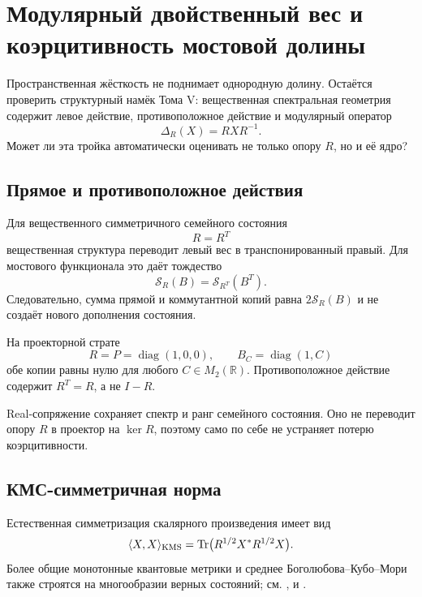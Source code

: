\chapter{Модулярный двойственный вес и коэрцитивность мостовой долины}

Пространственная жёсткость не поднимает однородную долину. Остаётся
проверить структурный намёк Тома V: вещественная спектральная геометрия
содержит левое действие, противоположное действие и модулярный оператор
\begin{equation}
 \Delta_R(X)=RXR^{-1}.
\end{equation}
Может ли эта тройка автоматически оценивать не только опору $R$, но и её
ядро?

\section{Прямое и противоположное действия}

Для вещественного симметричного семейного состояния
\begin{equation}
 R=R^T
\end{equation}
вещественная структура переводит левый вес в транспонированный правый.
Для мостового функционала это даёт тождество
\begin{equation}
 \mathcal S_R(B)=\mathcal S_{R^T}(B^T).
 \label{eq:v6-modular-dual-transpose-identity}
\end{equation}
Следовательно, сумма прямой и коммутантной копий равна
$2\mathcal S_R(B)$ и не создаёт нового дополнения состояния.

На проекторной страте
\begin{equation}
 R=P=\operatorname{diag}(1,0,0),
 \qquad B_C=\operatorname{diag}(1,C)
\end{equation}
обе копии равны нулю для любого $C\in M_2(\mathbb R)$. Противоположное
действие содержит $R^T=R$, а не $I-R$.

\begin{proposition}
Real-сопряжение сохраняет спектр и ранг семейного состояния. Оно не
переводит опору $R$ в проектор на $\ker R$, поэтому само по себе не
устраняет потерю коэрцитивности.
\end{proposition}

\section{КМС-симметричная норма}

Естественная симметризация скалярного произведения имеет вид
\begin{equation}
 \langle X,X\rangle_{\rm KMS}
 =\operatorname{Tr}\bigl(R^{1/2}X^*R^{1/2}X\bigr).
 \label{eq:v6-modular-kms-norm}
\end{equation}
Более общие монотонные квантовые метрики и среднее Боголюбова--Кубо--Мори
также строятся на многообразии верных состояний; см.
,  и
.

